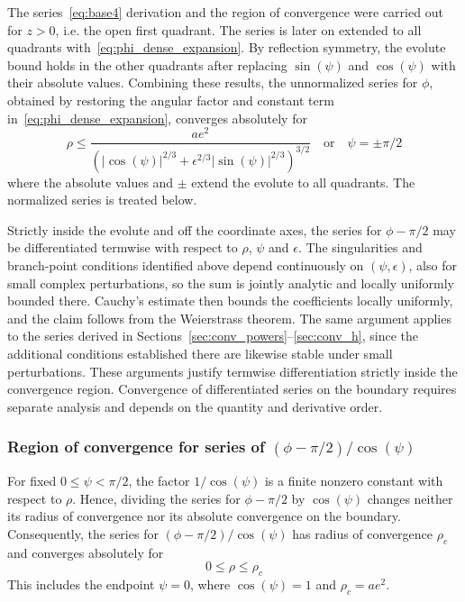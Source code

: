 \documentclass[a4paper]{amsart}
\begin{document}
The series~\eqref{eq:base4} derivation and the region of convergence were carried out for $z>0$, i.e. the open first quadrant. The series is later on extended to all quadrants with~\eqref{eq:phi_dense_expansion}. By reflection symmetry, the evolute bound holds in the other quadrants after replacing $\sin(\psi)$ and $\cos(\psi)$ with their absolute values. Combining these results, the unnormalized series for $\phi$, obtained by restoring the angular factor and constant term in~\eqref{eq:phi_dense_expansion}, converges absolutely for
\begin{equation*}
\rho \leq \frac{ae^2}{\left(|\cos(\psi)|^{2/3}+\epsilon^{2/3}|\sin(\psi)|^{2/3}\right)^{3/2}}\quad\text{or}\quad \psi=\pm\pi/2
\end{equation*}
where the absolute values and $\pm$ extend the evolute to all quadrants. The normalized series is treated below.

Strictly inside the evolute and off the coordinate axes, the series for $\phi-\pi/2$ may be differentiated termwise with respect to $\rho$, $\psi$ and $\epsilon$. The singularities and branch-point conditions identified above depend continuously on $(\psi,\epsilon)$, also for small complex perturbations, so the sum is jointly analytic and locally uniformly bounded there. Cauchy's estimate then bounds the coefficients locally uniformly, and the claim follows from the Weierstrass theorem. The same argument applies to the series derived in Sections~\ref{sec:conv_powers}--\ref{sec:conv_h}, since the additional conditions established there are likewise stable under small perturbations. These arguments justify termwise differentiation strictly inside the convergence region. Convergence of differentiated series on the boundary requires separate analysis and depends on the quantity and derivative order.


\subsubsection{Region of convergence for series of $(\phi-\pi/2)/\cos(\psi)$}
For fixed $0\leq\psi<\pi/2$, the factor $1/\cos(\psi)$ is a finite nonzero constant with respect to $\rho$. Hence, dividing the series for $\phi-\pi/2$ by $\cos(\psi)$ changes neither its radius of convergence nor its absolute convergence on the boundary. Consequently, the series for $(\phi-\pi/2)/\cos(\psi)$ has radius of convergence $\rho_c$
and converges absolutely for
\begin{equation*}
0\leq\rho\leq\rho_c
\end{equation*}
This includes the endpoint $\psi=0$, where $\cos(\psi)=1$ and
$\rho_c=ae^2$.
\end{document}
